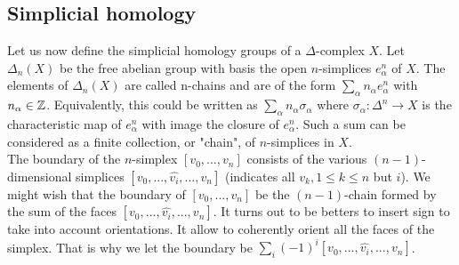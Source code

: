 \documentclass[12pt]{article}
\begin{document}
\subsection{Simplicial homology}

Let us now define the simplicial homology groups of a $\Delta$-complex $X$. Let $\Delta_n(X)$ be the free abelian group with basis the open $n$-simplices $e^n_\alpha$ of $X$. The elements of $\Delta_n(X)$ are called n-chains and are of the form $\sum_\alpha n_\alpha e^n_\alpha$ with $n_\alpha \in \mathbb{Z}$. Equivalently, this could be written as $\sum_\alpha n_\alpha \sigma_\alpha$ where $\sigma_\alpha : \Delta^n \to X$ is the characteristic map of $e^n_\alpha$ with image the closure of $e^n_\alpha$. Such a sum can be considered as a finite collection, or "chain", of $n$-simplices in $X$.\\

The boundary of the $n$-simplex $[v_0, ..., v_n]$ consists of the various $(n-1)$-dimensional simplices $[v_0, ... , \hat{v_i} , ... , v_n]$ (indicates all $v_{k}, 1 \le k \le n$ but $i$). We might wish that the boundary of  $[v_0, ..., v_n]$ be the $(n-1)$-chain formed by the sum of the faces $[v_0, ... ,\hat{v_i} , ... , v_n]$. It turns out to be betters to insert sign to take into account orientations. It allow to coherently orient all the faces of the simplex. That is why we let the boundary be $\sum_i (-1)^i [v_0, ... , \hat{v_i} , ... , v_n]$.\\
\end{document}
